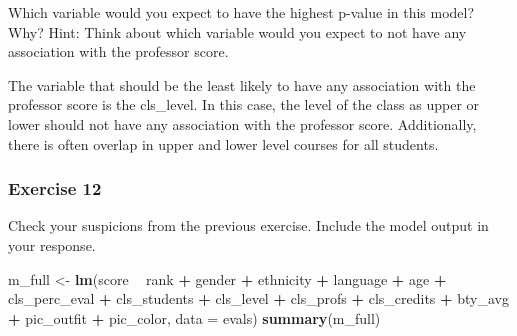 \documentclass[
]{article}
\newenvironment{Shaded}{\begin{snugshade}}{\end{snugshade}}
\newcommand{\DataTypeTok}[1]{\textcolor[rgb]{0.13,0.29,0.53}{#1}}
\newcommand{\KeywordTok}[1]{\textcolor[rgb]{0.13,0.29,0.53}{\textbf{#1}}}
\newcommand{\NormalTok}[1]{#1}
\newcommand{\OperatorTok}[1]{\textcolor[rgb]{0.81,0.36,0.00}{\textbf{#1}}}
\newcommand{\StringTok}[1]{\textcolor[rgb]{0.31,0.60,0.02}{#1}}
\begin{document}
Which variable would you expect to have the highest p-value in this
model? Why? Hint: Think about which variable would you expect to not
have any association with the professor score.

The variable that should be the least likely to have any association
with the professor score is the cls\_level. In this case, the level of
the class as upper or lower should not have any association with the
professor score. Additionally, there is often overlap in upper and lower
level courses for all students.

\hypertarget{exercise-12}{%
\subsubsection{Exercise 12}\label{exercise-12}}

Check your suspicions from the previous exercise. Include the model
output in your response.

\begin{Shaded}
\begin{Highlighting}[]
\NormalTok{m_full <-}\StringTok{ }\KeywordTok{lm}\NormalTok{(score }\OperatorTok{~}\StringTok{ }\NormalTok{rank }\OperatorTok{+}\StringTok{ }\NormalTok{gender }\OperatorTok{+}\StringTok{ }\NormalTok{ethnicity }\OperatorTok{+}\StringTok{ }\NormalTok{language }\OperatorTok{+}\StringTok{ }\NormalTok{age }\OperatorTok{+}\StringTok{ }\NormalTok{cls_perc_eval }
             \OperatorTok{+}\StringTok{ }\NormalTok{cls_students }\OperatorTok{+}\StringTok{ }\NormalTok{cls_level }\OperatorTok{+}\StringTok{ }\NormalTok{cls_profs }\OperatorTok{+}\StringTok{ }\NormalTok{cls_credits }\OperatorTok{+}\StringTok{ }\NormalTok{bty_avg }
             \OperatorTok{+}\StringTok{ }\NormalTok{pic_outfit }\OperatorTok{+}\StringTok{ }\NormalTok{pic_color, }\DataTypeTok{data =}\NormalTok{ evals)}
\KeywordTok{summary}\NormalTok{(m_full)}
\end{Highlighting}
\end{Shaded}
\end{document}
